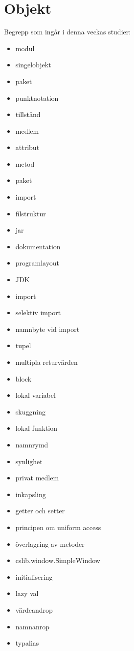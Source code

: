 \chapter{Objekt}\label{chapter:W04}
Begrepp som ingår i denna veckas studier:
\begin{multicols}{2}\begin{itemize}[noitemsep,label={$\square$},leftmargin=*]
\item modul
\item singelobjekt
\item paket
\item punktnotation
\item tillstånd
\item medlem
\item attribut
\item metod
\item paket
\item import
\item filstruktur
\item jar
\item dokumentation
\item programlayout
\item JDK
\item import
\item selektiv import
\item namnbyte vid import
\item tupel
\item multipla returvärden
\item block
\item lokal variabel
\item skuggning
\item lokal funktion
\item namnrymd
\item synlighet
\item privat medlem
\item inkapsling
\item getter och setter
\item principen om uniform access
\item överlagring av metoder
\item cslib.window.SimpleWindow
\item initialisering
\item lazy val
\item värdeandrop
\item namnanrop
\item typalias\end{itemize}\end{multicols}
